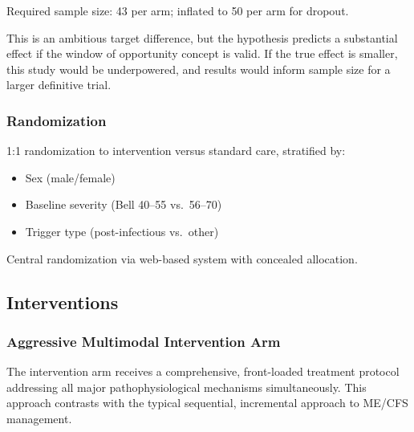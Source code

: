 Required sample size: 43 per arm; inflated to 50 per arm for dropout.

This is an ambitious target difference, but the hypothesis predicts a substantial effect if the window of opportunity concept is valid. If the true effect is smaller, this study would be underpowered, and results would inform sample size for a larger definitive trial.

\subsubsection{Randomization}
1:1 randomization to intervention versus standard care, stratified by:
\begin{itemize}
    \item Sex (male/female)
    \item Baseline severity (Bell 40--55 vs.\ 56--70)
    \item Trigger type (post-infectious vs.\ other)
\end{itemize}

Central randomization via web-based system with concealed allocation.

\subsection{Interventions}

\subsubsection{Aggressive Multimodal Intervention Arm}

The intervention arm receives a comprehensive, front-loaded treatment protocol addressing all major pathophysiological mechanisms simultaneously. This approach contrasts with the typical sequential, incremental approach to ME/CFS management.

